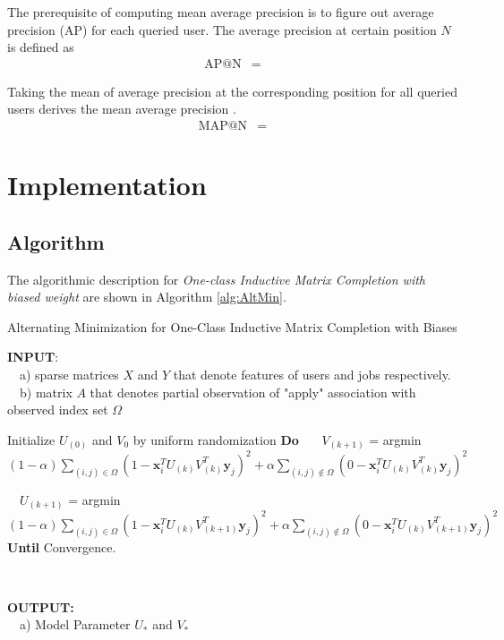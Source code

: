 \documentclass{article} %
\begin{document}
The prerequisite of computing mean average precision is to figure out average
precision (AP) for each queried user. The average precision at certain
position $N$ is defined as
\begin{align}
    \text{AP@N} &= 
\end{align}

Taking the mean of average precision at the corresponding position for all
queried users derives the mean average precision .
\begin{align}
    \text{MAP@N} &= 
\end{align}


\section{Implementation}
\subsection{Algorithm}
\newcommand{\xii}{\boldsymbol{x}_i}
\newcommand{\yj}{\boldsymbol{y}_j}
The algorithmic description for {\it One-class Inductive Matrix Completion
    with biased weight} are shown in Algorithm \ref{alg:AltMin}.  
\begin{algorithm}
    \caption{Alternating Minimization for One-Class Inductive Matrix Completion with Biases}
    \label{alg:AltMin}
    \begin{algorithmic}[1]

\State \textbf{INPUT}: \\ \ \ a) sparse matrices $X$ and $Y$ that denote features of users
and jobs respectively. \\ \ \ b) matrix $A$ that denotes partial observation
of "apply" association with observed index set $\Omega$ \State \

\State Initialize $U_{(0)}$ and $V_{0}$ by uniform randomization
\State \textbf{Do}  
\State \ \ \
$V_{(k+1)}$ = argmin $(1-\alpha) \sum_{(i,j) \in \Omega} 
    (1- \xii^T U_{(k)} V_{(k)}^T \yj)^2 
    + \alpha \sum_{(i,j) \not \in \Omega} (0 - \xii^T U_{(k)} V_{(k)}^T \yj)^2$

\State \  \
$U_{(k+1)}$ = argmin $(1-\alpha) \sum_{(i,j) \in \Omega}
    (1-\xii^T U_{(k)} V_{(k+1)}^T \yj)^2 +
    \alpha \sum_{(i,j) \not \in \Omega}
    (0-\xii^T U_{(k)} V_{(k+1)}^T \yj)^2$
\State \textbf{Until} Convergence. 

\State \

\State \textbf{OUTPUT: } \\ 
\ \ a) Model Parameter $ U_{*}$ and $V_{*}$ 
\end{algorithmic}
\end{algorithm}
\end{document}
